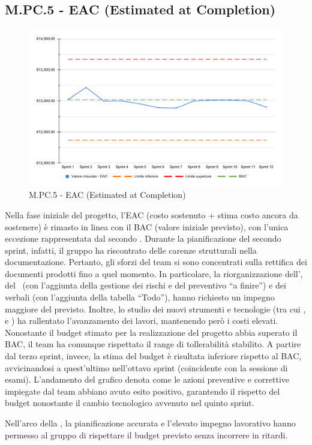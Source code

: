 \subsection{M.PC.5 - EAC (Estimated at Completion)}
\begin{figure}[H]
    \centering
    \includegraphics[width=\textwidth]{assets/stima_a_finire.pdf}
    \caption{M.PC.5 - EAC (Estimated at Completion)}
\end{figure}

\par Nella fase iniziale del progetto, l'EAC (costo sostenuto + stima costo ancora da sostenere) è rimasto in linea con il BAC (valore iniziale previsto), con l'unica eccezione rappresentata dal secondo . Durante la pianificazione del secondo sprint, infatti, il gruppo ha riscontrato delle carenze strutturali nella documentazione. Pertanto, gli sforzi del team si sono concentrati sulla rettifica dei documenti prodotti fino a quel momento. In particolare, la riorganizzazione dell'\AdR, del \PdP\ (con l'aggiunta della gestione dei rischi e del preventivo “a finire”) e dei verbali (con l'aggiunta della tabella “Todo”), hanno richiesto un impegno maggiore del previsto. Inoltre, lo studio dei nuovi strumenti e tecnologie (tra cui ,  e ) ha rallentato l'avanzamento dei lavori, mantenendo però i costi elevati. Nonostante il budget stimato per la realizzazione del progetto abbia superato il BAC, il team ha comunque rispettato il range di tollerabilità stabilito. A partire dal terzo sprint, invece, la stima del budget è risultata inferiore rispetto al BAC, avvicinandosi a quest'ultimo nell'ottavo sprint (coincidente con la sessione di esami). L'andamento del grafico denota come le azioni preventive e correttive impiegate dal team abbiano avuto esito positivo, garantendo il rispetto del budget nonostante il cambio tecnologico avvenuto nel quinto sprint.

\par Nell'arco della , la pianificazione accurata e l'elevato impegno lavorativo hanno permesso al gruppo di rispettare il budget previsto senza incorrere in ritardi. 